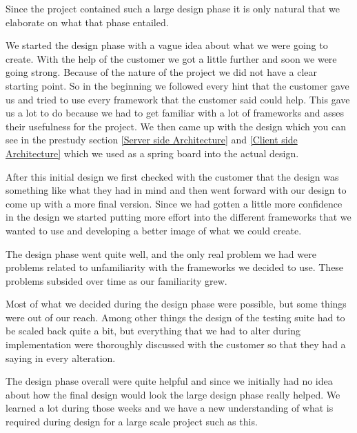 Since the project contained such a large design phase it is only natural that we elaborate on what that phase entailed.

We started the design phase with a vague idea about what we were going to create. With the help of the customer we got a little further and soon we were going strong. Because of the nature of the project we did not have a clear starting point. So in the beginning we followed every hint that the customer gave us and tried to use every framework that the customer said could help. This gave us a lot to do because we had to get familiar with a lot of frameworks and asses their usefulness for the project. We then came up with the design which you can see in the prestudy section \ref{Server side Architecture} and \ref{Client side Architecture} which we used as a spring board into the actual design.

After this initial design we first checked with the customer that the design was something like what they had in mind and then went forward with our design to come up with a more final version. Since we had gotten a little more confidence in the design we started putting more effort into the different frameworks that we wanted to use and developing a better image of what we could create.

The design phase went quite well, and the only real problem we had were problems related to unfamiliarity with the frameworks we decided to use. These problems subsided over time as our familiarity grew.

Most of what we decided during the design phase were possible, but some things were out of our reach. Among other things the design of the testing suite had to be scaled back quite a bit, but everything that we had to alter during implementation were thoroughly discussed with the customer so that they had a saying in every alteration.

The design phase overall were quite helpful and since we initially had no idea about how the final design would look the large design phase really helped. We learned a lot during those weeks and we have a new understanding of what is required during design for a large scale project such as this.
